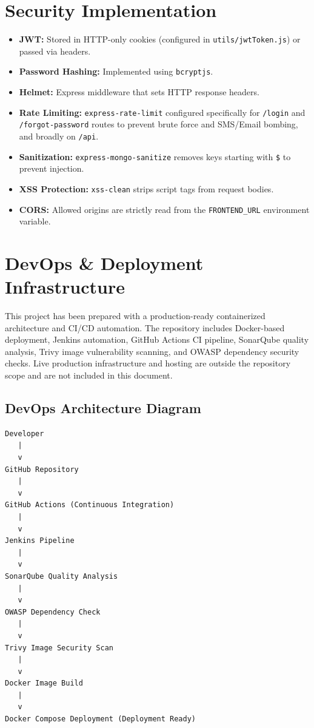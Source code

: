 \documentclass[11pt,a4paper]{article}
\begin{document}
\section{Security Implementation}
\begin{itemize}[leftmargin=*]
    \item \textbf{JWT:} Stored in HTTP-only cookies (configured in
          \texttt{utils/jwtToken.js}) or passed via headers.
    \item \textbf{Password Hashing:} Implemented using \texttt{bcryptjs}.
    \item \textbf{Helmet:} Express middleware that sets HTTP response headers.
    \item \textbf{Rate Limiting:} \texttt{express-rate-limit} configured
          specifically for \texttt{/login} and \texttt{/forgot-password}
          routes to prevent brute force and SMS/Email bombing, and broadly
          on \texttt{/api}.
    \item \textbf{Sanitization:} \texttt{express-mongo-sanitize} removes keys
          starting with \texttt{\$} to prevent injection.
    \item \textbf{XSS Protection:} \texttt{xss-clean} strips script tags from
          request bodies.
    \item \textbf{CORS:} Allowed origins are strictly read from the
          \texttt{FRONTEND\_URL} environment variable.
\end{itemize}

\section{DevOps \& Deployment Infrastructure}
This project has been prepared with a production-ready containerized
architecture and CI/CD automation. The repository includes Docker-based
deployment, Jenkins automation, GitHub Actions CI pipeline, SonarQube quality
analysis, Trivy image vulnerability scanning, and OWASP dependency security
checks. Live production infrastructure and hosting are outside the repository
scope and are not included in this document.

\subsection*{DevOps Architecture Diagram}
\begin{verbatim}
Developer
   |
   v
GitHub Repository
   |
   v
GitHub Actions (Continuous Integration)
   |
   v
Jenkins Pipeline
   |
   v
SonarQube Quality Analysis
   |
   v
OWASP Dependency Check
   |
   v
Trivy Image Security Scan
   |
   v
Docker Image Build
   |
   v
Docker Compose Deployment (Deployment Ready)
\end{verbatim}
\end{document}

